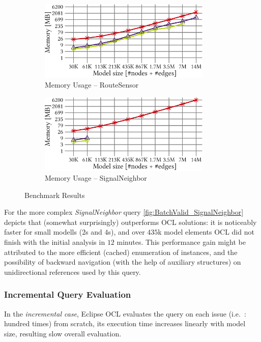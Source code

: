 \begin{figure}[ht]
\begin{center}
	\begin{subfigure}[t]{0.48\textwidth}\centering
	    \includegraphics[width=0.9\textwidth]{figures/trainBenchmark_User_Memory_RouteSensor}
	    \caption{Memory Usage -- RouteSensor}
	    \label{fig:Memory_RouteSensor}
	\end{subfigure}
	\begin{subfigure}[t]{0.48\textwidth}\centering
	    \includegraphics[width=0.9\textwidth]{figures/trainBenchmark_User_Memory_SignalNeighbor}
	    \caption{Memory Usage -- SignalNeighbor}
	    \label{fig:Memory_SignalNeighbor}
	\end{subfigure}
  \caption{Benchmark Results}
  \label{fig:trainbenchmark-diagrams}
\end{center}
\end{figure}

For the more complex \emph{SignalNeighbor} query
\autoref{fig:BatchValid_SignalNeighbor} depicts that \incquery{} (somewhat
surprisingly) outperforms OCL solutions: it is noticeably faster for small
modells ($2$s and $4$s), and over $435$k model elements OCL did not finish with
the initial analysis in $12$ minutes. This performance gain might be attributed to
the more efficient (cached) enumeration of instances, and the possibility of
backward navigation (with the help of auxiliary structures) on unidirectional
references used by this query.

\subsubsection{Incremental Query Evaluation}
In the \emph{incremental case}, Eclipse OCL evaluates the query on each issue
(i.e.\ : hundred times) from scratch, its execution time increases linearly with
model size, resulting slow overall evaluation.

